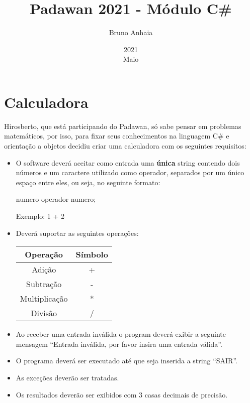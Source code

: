 \documentclass[12pt]{article}
\title{Padawan 2021 - Módulo C\#}
\date{2021\\ Maio}
\author{Bruno Anhaia}
\begin{document}
\maketitle

\section{Calculadora}
\justifying
Hirosberto, que está participando do Padawan, só sabe pensar em problemas matemáticos, por isso, para fixar seus conhecimentos na linguagem C\# e orientação a objetos decidiu criar uma calculadora com os seguintes requisitos:

\begin{itemize}
    \item O software deverá aceitar como entrada uma \textbf{única} string contendo dois números e um caractere utilizado como operador, separados por um único espaço entre eles, ou seja, no seguinte formato:

          \begin{center}
              numero \space\space operador \space\space numero;
          \end{center}

          Exemplo: 1 + 2

    \item Deverá suportar as seguintes operações:

          \begin{center}\begin{tabular}{c | c}
                  \hline
                  \textbf{Operação} & \textbf{Símbolo} \\
                  \hline
                  Adição            & +                \\
                  Subtração         & -                \\
                  Multiplicação     & *                \\
                  Divisão           & /                \\
                  \hline
              \end{tabular}\end{center}

    \item Ao receber uma entrada inválida o program deverá exibir a seguinte mensagem ``Entrada inválida, por favor insira uma entrada válida''.
    \item O programa deverá ser executado até que seja inserida a string ``SAIR''.
    \item As exceções deverão ser tratadas.
    \item Os resultados deverão ser exibidos com 3 casas decimais de precisão.
\end{itemize}
\end{document}
